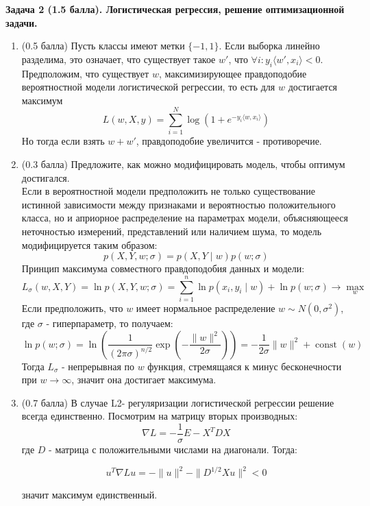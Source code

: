 \documentclass[10pt]{article}
\begin{document}
	\textbf{Задача 2 (1.5 балла). Логистическая регрессия, решение оптимизационной задачи.} \\
	\begin{enumerate}
		\item{(0.5 балла)}
		Пусть классы имеют метки $\{-1, 1\}$. Если выборка линейно разделима, это означает, что существует такое $w'$, что 
		$\forall i : y_{i}\langle w', x_{i}\rangle < 0 $. Предположим, что существует $w$, максимизирующее правдоподобие вероятностной модели логистической регрессии, то есть для $w$ достигается максимум\\
		$$L(w, X, y)=\sum_{i=1}^{N} \log \left(1+e^{-y_{i}\langle w, x_{i}\rangle}\right)$$
		Но тогда если взять $w + w'$, правдоподобие увеличится - противоречие.
		\item{(0.3 балла)} Предложите, как можно модифицировать модель, чтобы оптимум достигался. \\
		Если в вероятностной модели предположить не только существование истинной зависимости между признаками и вероятностью положительного класса, но и априорное распределение на параметрах модели, объясняющееся неточностью измерений, представлений или наличием шума, то модель модифицируется таким образом:\\
		$$
		p\left(X, Y, w ; \sigma \right)=p\left(X, Y \mid w\right) p(w ; \sigma)
		$$
		Принцип максимума совместного правдоподобия данных и модели:
		$$
		L_{\sigma}\left(w, X, Y\right)=\ln p\left(X, Y, w ; \sigma \right)=\sum_{i=1}^{n} \ln p\left(x_{i}, y_{i} \mid w\right)+\ln p(w ; \sigma) \rightarrow \max _{w}
		$$
		Если предположить, что $w$ имеет нормальное распределение $
		w \sim N\left(0, \sigma^{2}\right)
		$, где  $\sigma$ - гиперпараметр, то получаем:\\
		$$
		\ln p(w ; \sigma)=\ln \left(\frac{1}{(2 \pi \sigma)^{n / 2}} \exp \left(-\frac{\|w\|^{2}}{2 \sigma}\right)\right)=-\frac{1}{2 \sigma}\|w\|^{2}+\operatorname{const}(w)
		$$
		Тогда $L_{\sigma}$ - непрерывная по $w$ функция, стремящаяся к минус бесконечности при $w \rightarrow \infty$, значит она достигает максимума.
		
		\item{(0.7 балла)} 
		В случае L2- регуляризации логистической регрессии решение всегда единственно. Посмотрим на матрицу вторых производных:\\
		$$\nabla L = -\frac{1}{\sigma}E - X^T DX$$
		где $D$ - матрица с положительными числами на диагонали. Тогда:
		
		$$u^T \nabla L u = -\|u\|^{2} - \|D^{1/2}Xu\|^2 < 0$$
		
		значит максимум единственный.
	\end{enumerate}
	
\end{document}
